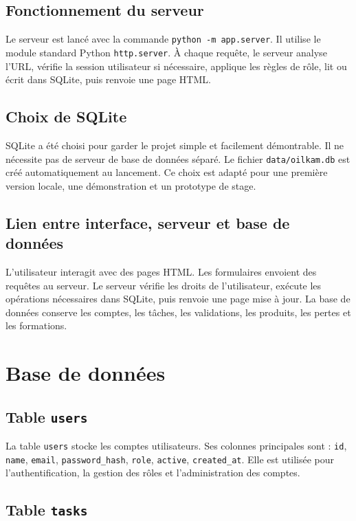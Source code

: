 \documentclass[11pt,a4paper]{article}
\newcommand{\code}[1]{\texttt{#1}}
\begin{document}
\subsection{Fonctionnement du serveur}

Le serveur est lancé avec la commande \code{python -m app.server}. Il utilise le module standard Python \code{http.server}. À chaque requête, le serveur analyse l'URL, vérifie la session utilisateur si nécessaire, applique les règles de rôle, lit ou écrit dans SQLite, puis renvoie une page HTML.

\subsection{Choix de SQLite}

SQLite a été choisi pour garder le projet simple et facilement démontrable. Il ne nécessite pas de serveur de base de données séparé. Le fichier \code{data/oilkam.db} est créé automatiquement au lancement. Ce choix est adapté pour une première version locale, une démonstration et un prototype de stage.

\subsection{Lien entre interface, serveur et base de données}

L'utilisateur interagit avec des pages HTML. Les formulaires envoient des requêtes au serveur. Le serveur vérifie les droits de l'utilisateur, exécute les opérations nécessaires dans SQLite, puis renvoie une page mise à jour. La base de données conserve les comptes, les tâches, les validations, les produits, les pertes et les formations.

\section{Base de données}

\subsection{Table \code{users}}

La table \code{users} stocke les comptes utilisateurs. Ses colonnes principales sont : \code{id}, \code{name}, \code{email}, \code{password\_hash}, \code{role}, \code{active}, \code{created\_at}. Elle est utilisée pour l'authentification, la gestion des rôles et l'administration des comptes.

\subsection{Table \code{tasks}}
\end{document}

